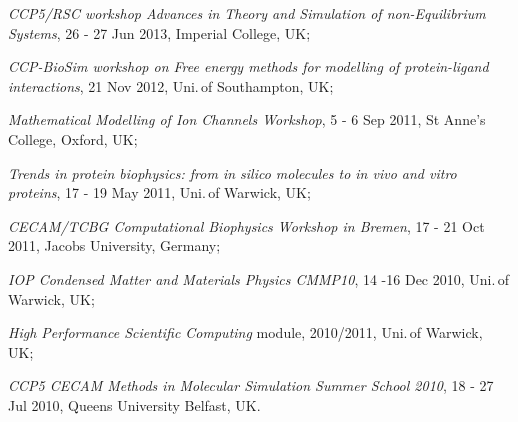 \documentclass[a4paper,10pt,final]{memoir}
\begin{document}
\begin{compactitem}[\color{RoyalBlue}$\circ$]
\item \textit{CCP5/RSC workshop Advances in Theory and Simulation of non-Equilibrium Systems},
  26 - 27 Jun 2013, Imperial College, UK;
\item \textit{CCP-BioSim workshop on Free energy methods for modelling of protein-ligand
  interactions}, 21 Nov 2012, Uni.\,of Southampton, UK;
\item \textit{Mathematical Modelling of Ion Channels Workshop}, 5 - 6 Sep 2011, St Anne's
  College, Oxford, UK;
\item \textit{Trends in protein biophysics: from in silico molecules to in vivo and vitro
  proteins}, 17 - 19 May 2011, Uni.\,of Warwick, UK;
\item \textit{CECAM/TCBG Computational Biophysics Workshop in Bremen},  17 - 21 Oct 2011,
  Jacobs University, Germany;  
\item \textit{IOP Condensed Matter and Materials Physics CMMP10}, 14 -16 Dec 2010,
  Uni.\,of Warwick, UK;
\item \textit{High Performance Scientific Computing} module, 2010/2011, Uni.\,of Warwick,
  UK;
\item \textit{CCP5 CECAM Methods in Molecular Simulation Summer School 2010}, 18 - 27 Jul 2010, Queens University
  Belfast, UK.
\end{compactitem}
\end{document}
